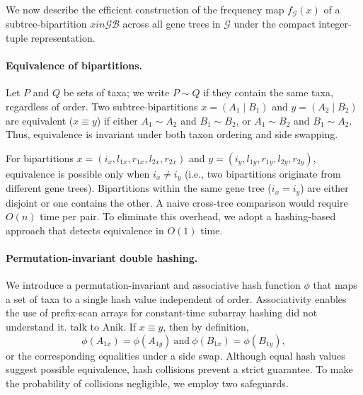 \documentclass[10pt,a4paper]{article}
\newcommand{\addr}[1]{{\color{red} #1}}
\begin{document}
We now describe the efficient construction of the frequency map $f_{\mathcal{G}}(x)$ of a subtree-bipartition $x in \mathcal{GB}$ across all gene trees in $\mathcal{G}$ under the compact integer-tuple representation. 

\paragraph{Equivalence of bipartitions.}
Let $P$ and $Q$ be sets of taxa; we write $P \sim Q$ if they contain the same taxa, regardless of order. Two subtree-bipartitions $x = (A_1 \mid B_1)$ and $y = (A_2 \mid B_2)$ are equivalent ($x \equiv y$) if either $A_1 \sim A_2$ and $B_1 \sim B_2$, or $A_1 \sim B_2$ and $B_1 \sim A_2$. Thus, equivalence is invariant under both taxon ordering and side swapping.

For bipartitions $x = (i_x,l_{1x},r_{1x},l_{2x},r_{2x})$ and $y = (i_y,l_{1y},r_{1y},l_{2y},r_{2y})$, equivalence is possible only when $i_x \neq i_y$ (i.e., two bipartitions originate from different gene trees). Bipartitions within the same gene tree ($i_x = i_y$) are either disjoint or one contains the other. A naive cross-tree comparison would require $O(n)$ time per pair. To eliminate this overhead, we adopt a hashing-based approach that detects equivalence in $O(1)$ time.


    

\paragraph{Permutation-invariant double hashing.}
\label{para:hashing-and-freq-mapping}
We introduce a permutation-invariant and associative hash function $\phi$ that maps a set of taxa to a single hash value independent of order. Associativity enables the use of prefix-scan arrays for constant-time subarray hashing \addr{did not understand it. talk to Anik}. If $x \equiv y$, then by definition,
\[
\phi(A_{1x}) = \phi(A_{1y}) \ \text{and}\  \phi(B_{1x}) = \phi(B_{1y}), 
\]
or the corresponding equalities under a side swap. Although equal hash values suggest possible equivalence, hash collisions prevent a strict guarantee. To make the probability of collisions negligible, we employ two safeguards.
\end{document}
